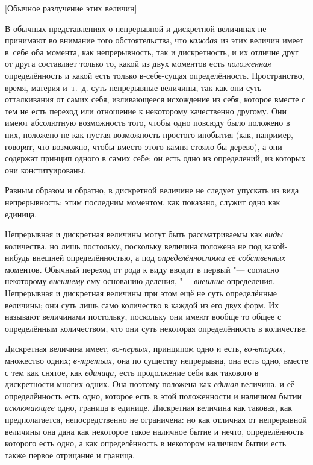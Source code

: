 %
{[Обычное разлучение этих величин]}

В обычных представлениях о непрерывной и дискретной величинах не принимают во
внимание того обстоятельства, что {\em каждая} из этих величин имеет в~себе оба
момента, как непрерывность, так и дискретность, и их отличие друг от друга
составляет только то, какой из двух моментов есть {\em положенная}
определённость и какой есть только в-себе-сущая определённость. Пространство,
время, материя и~т.~д. суть непрерывные величины, так как они суть отталкивания
от самих себя, изливающееся исхождение из себя, которое вместе с тем не есть
переход или отношение к некоторому качественно другому. Они имеют абсолютную
возможность того, чтобы одно повсюду было положено в них, положено не как
пустая возможность простого инобытия (как, например, говорят, что возможно,
чтобы вместо этого камня стояло бы дерево), а они содержат принцип одного в
самих себе; он есть одно из определений, из которых они конституированы.

Равным образом и обратно, в дискретной величине не следует упускать из вида
непрерывность; этим последним моментом, как показано, служит одно как единица.

Непрерывная и дискретная величины могут быть рассматриваемы как {\em виды}
количества, но лишь постольку, поскольку величина положена не под какой-нибудь
внешней определённостью, а под {\em определённостями её собственных} моментов.
Обычный переход от рода к виду вводит в первый "--- согласно некоторому
{\em внешнему} ему основанию деления, "--- {\em внешние} определения.
Непрерывная и дискретная величины при этом ещё не суть определённые величины;
они суть лишь само количество в каждой из его двух форм. Их называют величинами
постольку, поскольку они имеют вообще то общее с определённым количеством, что
они суть некоторая определённость в количестве.


Дискретная величина имеет, {\em во-первых,} принципом одно и есть,
{\em во-вторых,} множество одних; {\em в-третьих,} она по существу непрерывна,
она есть одно, вместе с тем как снятое, как {\em единица,} есть продолжение
себя как такового в дискретности многих одних. Она поэтому положена как
{\em единая} величина, и её определённость есть одно, которое есть в этой
положенности и наличном бытии {\em исключающее} одно, граница в единице.
Дискретная величина как таковая, как предполагается, непосредственно не
ограничена: но как отличная от непрерывной величины она дана как некоторое
такое наличное бытие и нечто, определённость которого есть одно, а как
определённость в некотором наличном бытии есть также первое
отрицание и граница.

